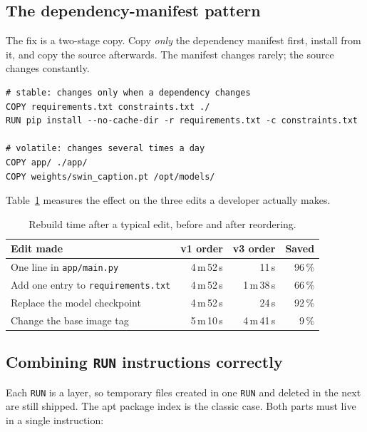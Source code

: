 \documentclass[10pt,a4paper]{article}
\begin{document}
\subsection{The dependency-manifest pattern}

The fix is a two-stage copy. Copy \emph{only} the dependency manifest
first, install from it, and copy the source afterwards. The manifest
changes rarely; the source changes constantly.

\begin{lstlisting}[style=dfile]
# stable: changes only when a dependency changes
COPY requirements.txt constraints.txt ./
RUN pip install --no-cache-dir -r requirements.txt -c constraints.txt

# volatile: changes several times a day
COPY app/ ./app/
COPY weights/swin_caption.pt /opt/models/
\end{lstlisting}

Table~\ref{tab:cachetime} measures the effect on the three edits a
developer actually makes.

\begin{table}[htbp]
\centering
\caption{Rebuild time after a typical edit, before and after reordering.}
\label{tab:cachetime}
\footnotesize
\begin{tabularx}{\linewidth}{@{}X r r r@{}}
\toprule
\textbf{Edit made} & \textbf{v1 order} & \textbf{v3 order} & \textbf{Saved} \\
\midrule
One line in \texttt{app/main.py}      & 4\,m\,52\,s & 11\,s & 96\,\% \\
Add one entry to \texttt{requirements.txt} & 4\,m\,52\,s & 1\,m\,38\,s & 66\,\% \\
Replace the model checkpoint          & 4\,m\,52\,s & 24\,s & 92\,\% \\
Change the base image tag             & 5\,m\,10\,s & 4\,m\,41\,s & 9\,\% \\
\bottomrule
\end{tabularx}
\end{table}

\subsection{Combining \texttt{RUN} instructions correctly}

Each \texttt{RUN} is a layer, so temporary files created in one
\texttt{RUN} and deleted in the next are still shipped. The apt package
index is the classic case. Both parts must live in a single instruction:
\end{document}
